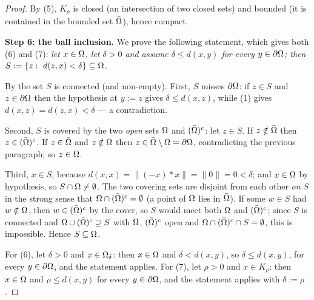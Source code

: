 \begin{proof}
By (5), $K_\rho$ is closed (an intersection of two closed sets) and bounded (it is contained
in the bounded set $\bar{\Omega}$), hence compact.

\medskip\noindent\textbf{Step 6: the ball inclusion.} We prove the following statement,
which gives both (6) and (7): \emph{let $x\in\Omega$, let $\delta>0$ and assume
$\delta\le d(x,y)$ for every $y\in\partial\Omega$; then $S:=\{z:\ d(z,x)<\delta\}\subseteq\Om$.}

By  the set $S$ is connected (and non-empty). First, $S$ misses
$\partial\Omega$: if $z\in S$ and $z\in\partial\Omega$ then the hypothesis at $y:=z$ gives
$\delta\le d(x,z)$, while (1) gives $d(x,z)=d(z,x)<\delta$ — a contradiction.

Second, $S$ is covered by the two \emph{open} sets $\Omega$ and $(\bar{\Omega})^{c}$: let $z\in S$.
If $z\notin\bar{\Omega}$ then $z\in(\bar{\Omega})^{c}$. If $z\in\bar{\Omega}$ and $z\notin\Omega$ then
$z\in\bar{\Omega}\setminus\Omega=\partial\Omega$, contradicting the previous paragraph; so $z\in\Omega$.

Third, $x\in S$, because $d(x,x)=\|(-x)*x\|=\|0\|=0<\delta$; and $x\in\Omega$ by hypothesis, so
$S\cap\Omega\ne\emptyset$. The two covering sets are disjoint from each other \emph{on} $S$ in
the strong sense that $\Omega\cap(\bar{\Omega})^{c}=\emptyset$ (a point of $\Omega$ lies in $\bar{\Omega}$).
If some $w\in S$ had $w\notin\Omega$, then $w\in(\bar{\Omega})^{c}$ by the cover, so $S$ would meet
both $\Omega$ and $(\bar{\Omega})^{c}$; since $S$ is connected and
$\Omega\cup(\bar{\Omega})^{c}\supseteq S$ with $\Omega$, $(\bar{\Omega})^{c}$ open and
$\Omega\cap(\bar{\Omega})^{c}\cap S=\emptyset$, this is impossible. Hence $S\subseteq\Omega$.

For (6), let $\delta>0$ and $x\in\Omega_\delta$: then $x\in\Omega$ and $\delta<d(x,y)$, so
$\delta\le d(x,y)$, for every $y\in\partial\Omega$, and the statement applies. For (7), let
$\rho>0$ and $x\in K_\rho$: then $x\in\Omega$ and $\rho\le d(x,y)$ for every $y\in\partial\Omega$,
and the statement applies with $\delta:=\rho$.
\end{proof}
